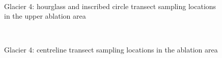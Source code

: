 \documentclass{sfuthesis}
\begin{document}
{\begin{appendices}
\begin{figure}[H]
	\\
\caption[]{Glacier 4: hourglass and inscribed circle transect sampling locations in the upper ablation area}
\end{figure}
	\begin{figure}[H]
	\centering
	\\
\caption[]{Glacier 4: centreline transect sampling locations in the ablation area}
\end{figure}
	\begin{figure}[H]
	\centering

\end{figure}
\end{appendices}}
\end{document}
